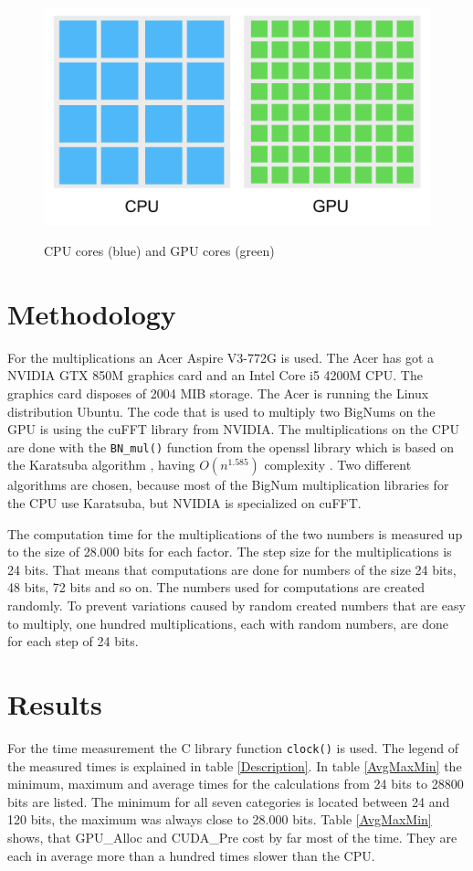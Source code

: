 \documentclass[12pt,a4paper]{article}
\begin{document}
\begin{figure}[hbt!]
\centering 
\caption{CPU cores (blue) and GPU cores (green)}
\includegraphics[scale=0.33]{cpugpu.png}
\label{cpu_gpu_cores} 
\end{figure}

\section{Methodology}
For the multiplications an Acer Aspire V3-772G is used. The Acer has got a NVIDIA GTX 850M graphics card and an Intel Core i5 4200M CPU. The graphics card disposes of 2004 MIB storage. The Acer is running the Linux distribution Ubuntu. The code that is used to multiply two BigNums on the GPU is using the cuFFT library from NVIDIA. The multiplications on the CPU are done with the \texttt{BN_mul()} function from the openssl library which is based on the Karatsuba algorithm \cite{young1995bnmul}, having $O(n^{1.585})$ complexity \cite{dietzfelbinger2012eff}. Two different algorithms are chosen, because most of the BigNum multiplication libraries for the CPU use Karatsuba, but NVIDIA is specialized on cuFFT.

The computation time for the multiplications of the two numbers is measured up to the size of 28.000 bits for each factor. The step size for the multiplications is 24 bits. That means that computations are done for numbers of the size 24 bits, 48 bits, 72 bits and so on. The numbers used for computations are created randomly. To prevent variations caused by random created numbers that are easy to multiply, one hundred multiplications, each with random numbers, are done for each step of 24 bits.

\section{Results}
For the time measurement the C library function \texttt{clock()} is used. The legend of the measured times is explained in table \ref{Description}. In table \ref{AvgMaxMin} the minimum, maximum and average times for the calculations from 24 bits to 28800 bits are listed. The minimum for all seven categories is located between 24 and 120 bits, the maximum was always close to 28.000 bits. Table \ref{AvgMaxMin} shows, that GPU\_Alloc and CUDA\_Pre cost by far most of the time. They are each in average more than a hundred times slower than the CPU.
\end{document}
